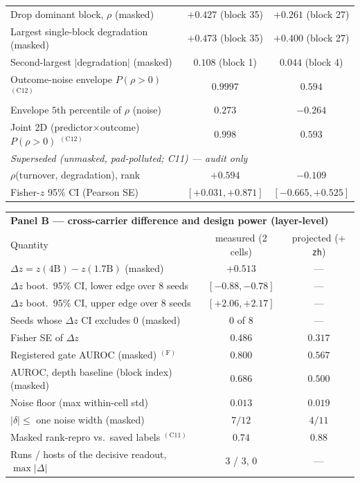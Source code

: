 \begin{table}[t]
{\begin{tabular}{lcc}
Drop dominant block, $\rho$ (masked)              & $+0.427$ (block 35) & $+0.261$ (block 27) \\
Largest single-block degradation (masked)         & $+0.473$ (block 35) & $+0.400$ (block 27) \\
Second-largest $|$degradation$|$ (masked)         & $0.108$ (block 1)   & $0.044$ (block 4) \\
\midrule
Outcome-noise envelope $P(\rho{>}0)$ $^{(\mathrm{C12})}$  & $0.9997$   & $0.594$ \\
Envelope $5$th percentile of $\rho$ (noise)       & $0.273$             & $-0.264$ \\
Joint 2D (predictor$\times$outcome) $P(\rho{>}0)$ $^{(\mathrm{C12})}$ & $0.998$ & $0.593$ \\
\midrule
\multicolumn{3}{l}{\emph{Superseded (unmasked, pad-polluted; C11) --- audit only}} \\
$\rho$(turnover, degradation), rank               & $+0.594$            & $-0.109$ \\
Fisher-$z$ 95\% CI (Pearson SE)                   & $[+0.031,+0.871]$   & $[-0.665,+0.525]$ \\
\bottomrule
\end{tabular}
}

\smallskip
\vspace{2pt}
{\footnotesize
\begin{tabular}{lcc}
\toprule
\multicolumn{3}{l}{\textbf{Panel B --- cross-carrier difference and design power (layer-level)}} \\
Quantity & measured (2 cells) & projected (${+}$\texttt{zh}) \\
\midrule
$\Delta z = z(\text{4B}) - z(\text{1.7B})$ (masked) & $+0.513$         & --- \\
$\Delta z$ boot.\ 95\% CI, lower edge over 8 seeds   & $[-0.88,-0.78]$  & --- \\
$\Delta z$ boot.\ 95\% CI, upper edge over 8 seeds   & $[+2.06,+2.17]$  & --- \\
Seeds whose $\Delta z$ CI excludes $0$ (masked)      & $0$ of 8         & --- \\
Fisher SE of $\Delta z$                             & $0.486$          & $0.317$ \\
Registered gate AUROC (masked) $^{(\mathrm{F})}$       & $0.800$          & $0.567$ \\
AUROC, depth baseline (block index) (masked)       & $0.686$          & $0.500$ \\
Noise floor (max within-cell std)                    & $0.013$          & $0.019$ \\
$|\delta| \le$ one noise width (masked)              & $7/12$           & $4/11$ \\
Masked rank-repro vs.\ saved labels $^{(\mathrm{C11})}$ & $0.74$        & $0.88$ \\
Runs / hosts of the decisive readout, $\max|\Delta|$& 3 / 3, $0$       & --- \\
\bottomrule
\end{tabular}
}


\end{table}
